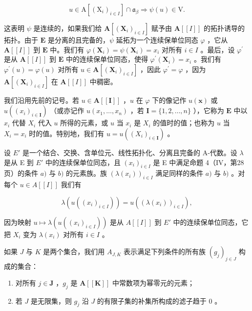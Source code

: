 \[
u \in \mathrm{A} \left[ \left(\mathrm{X} _ {i}\right) _ {i \in I} \right] \cap \mathfrak {a} _ {\beta} \Rightarrow \psi (u) \in \mathrm{V}.
\]

这表明 \(\psi\) 是连续的，如果我们给 \(\mathbf{A}[(\mathbf{X}_i)_{i\in I}]\) 赋予由 \(\mathbf{A}[[I]]\) 的拓扑诱导的拓扑。由于 \(\mathbf{E}\) 是分离的且完备的，\(\psi\) 延拓为一个连续保单位同态 \(\varphi\) ，它从 \(\mathbf{A}[[I]]\) 到 \(\mathbf{E}\) 中。我们有 \(\varphi (\mathbf{X}_i) = \psi (\mathbf{X}_i) = x_i\) 对所有 \(i\in I\) 。最后，设 \(\varphi^{\prime}\) 是从 \(\mathbf{A}[[I]]\) 到 \(\mathbf{E}\) 中的连续保单位同态，使得 \(\varphi^{\prime}(\mathbf{X}_{i}) = x_{i}\) 。我们有 \(\varphi^{\prime}(u) = \varphi (u)\) 对所有 \(u\in \mathbf{A}[(\mathbf{X}_i)_{i\in I}]\) ，因此 \(\varphi^{\prime} = \varphi\) ，因为 \(\mathbf{A}[(\mathbf{X}_i)_{i\in I}]\) 在 \(\mathbf{A}[[I]]\) 中稠密。

我们沿用先前的记号。若 \(u \in \mathbf{A}[[\mathbf{I}]]\) ，\(u\) 在 \(\varphi\) 下的像记作 \(u(\mathbf{x})\) 或 \(u((x_i)_{i \in \mathbf{I}})\) （或亦记作 \(u(x_1, \ldots, x_n)\) ，若 \(\mathbf{I} = \{1, 2, \ldots, n\}\) ），它称为 \(\mathbf{E}\) 中以 \(x_i\) 代替 \(X_i\) 代入 \(u\) 所得的元素，或 \(u\) 当 \(x_i\) 是 \(X_i\) 的值时的值；也称为 \(u\) 当 \(X_i = x_i\) 时的值。特别地，我们有 \(u = u((X_i)_{i \in \mathbf{I}})\) 。

设 \(E'\) 是一个结合、交换、含单位元、线性拓扑化、分离且完备的 A-代数。设 \(\lambda\) 是从 E 到 \(E'\) 中的连续保单位同态，且 \((x_i)_{i \in I}\) 是 E 中满足命题 4（IV，第28页）的条件 \(a)\) 与 \(b)\) 的元素族。族 \((\lambda(x_i))_{i \in I}\) 满足同样的条件 \(a)\) 与 \(b)\) 。对每个 \(u \in A[[I]]\) 我们有

\[
\lambda \left(u \left(\left(x _ {i}\right) _ {i \in I}\right)\right) = u \left(\left(\lambda \left(x _ {i}\right)\right) _ {i \in I}\right),\tag{3}
\]

因为映射 \(u \mapsto \lambda(u((x_i)_{i \in I}))\) 是从 \(A[[I]]\) 到 \(E'\) 中的连续保单位同态，它把 \(X_i\) 变为 \(\lambda(x_i)\) 对所有 \(i \in I\) 。

如果 \(J\) 与 \(K\) 是两个集合，我们用 \(A_{J,K}\) 表示满足下列条件的所有族 \((g_j)_{j \in J}\) 构成的集合：

\begin{enumerate}
\def\labelenumi{(\roman{enumi})}
\item
  对所有 \(j \in \mathbf{J}\) ，\(g_j\) 是 \(\mathbf{A}[[\mathbf{K}]]\) 中常数项为幂零元的元素；
\item
  若 \(J\) 是无限集，则 \(g_{j}\) 沿 \(J\) 的有限子集的补集所构成的滤子趋于 0 。
\end{enumerate}

